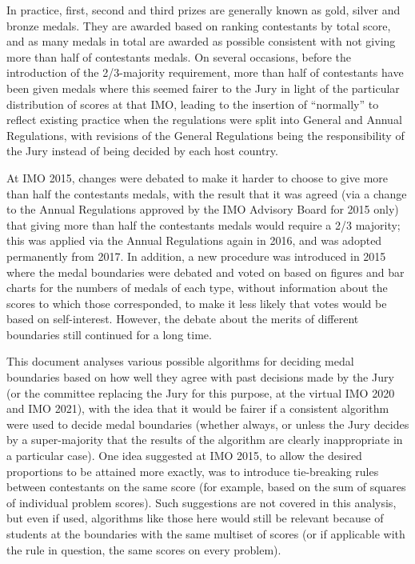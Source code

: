 \documentclass[a4paper,10pt]{article}
\begin{document}
In practice, first, second and third prizes are generally known as
gold, silver and bronze medals.  They are awarded based on ranking
contestants by total score, and as many medals in total are awarded as
possible consistent with not giving more than half of contestants
medals.  On several occasions, before the introduction of the
2/3-majority requirement, more than half of contestants have been
given medals where this seemed fairer to the Jury in light of the
particular distribution of scores at that IMO, leading to the
insertion of ``normally'' to reflect existing practice when the
regulations were split into General and Annual Regulations, with
revisions of the General Regulations being the responsibility of the
Jury instead of being decided by each host country.

At IMO 2015, changes were debated to make it harder to choose to give
more than half the contestants medals, with the result that it was
agreed (via a change to the Annual Regulations approved by the IMO
Advisory Board for 2015 only) that giving more than half the
contestants medals would require a 2/3 majority; this was
applied via the Annual Regulations again in 2016, and was adopted
permanently from 2017.  In addition, a new
procedure was introduced in 2015 where the medal boundaries were debated and
voted on based on figures and bar charts for the numbers of medals of
each type, without information about the scores to which those
corresponded, to make it less likely that votes would be based on
self-interest.  However, the debate about the merits of different
boundaries still continued for a long time.

This document analyses various possible algorithms for deciding medal
boundaries based on how well they agree with past decisions made by
the Jury (or the committee replacing the Jury for this purpose, at the
virtual IMO 2020 and IMO 2021), with the idea that it would be fairer
if a consistent
algorithm were used to decide medal boundaries (whether always, or
unless the Jury decides by a super-majority that the results of the
algorithm are clearly inappropriate in a particular case).  One idea
suggested at IMO 2015, to allow the desired proportions to be attained
more exactly, was to introduce tie-breaking rules between contestants
on the same score (for example, based on the sum of squares of
individual problem scores).  Such suggestions are not covered in this
analysis, but even if used, algorithms like those here would still be
relevant because of students at the boundaries with the same multiset
of scores (or if applicable with the rule in question, the same scores
on every problem).
\end{document}
